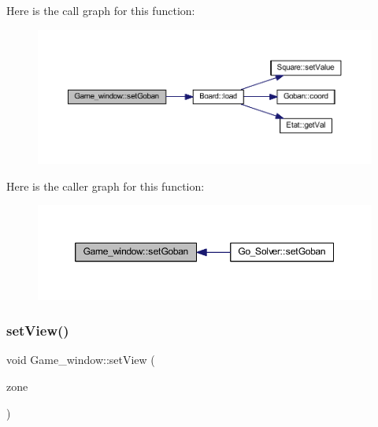Here is the call graph for this function\+:
\nopagebreak
\begin{figure}[H]
\begin{center}
\leavevmode
\includegraphics[width=350pt]{class_game__window_ac674f6d0db2bf60e92a0072d94e4c019_cgraph}
\end{center}
\end{figure}
Here is the caller graph for this function\+:
\nopagebreak
\begin{figure}[H]
\begin{center}
\leavevmode
\includegraphics[width=350pt]{class_game__window_ac674f6d0db2bf60e92a0072d94e4c019_icgraph}
\end{center}
\end{figure}
\mbox{\label{class_game__window_a5d130eb03ee63de5d63f91bcf6c56fa5}} 
\subsubsection{\texorpdfstring{set\+View()}{setView()}}
{\footnotesize\ttfamily void Game\+\_\+window\+::set\+View (\begin{DoxyParamCaption}\item[{const sf\+::\+Float\+Rect \&}]{zone }\end{DoxyParamCaption})}

